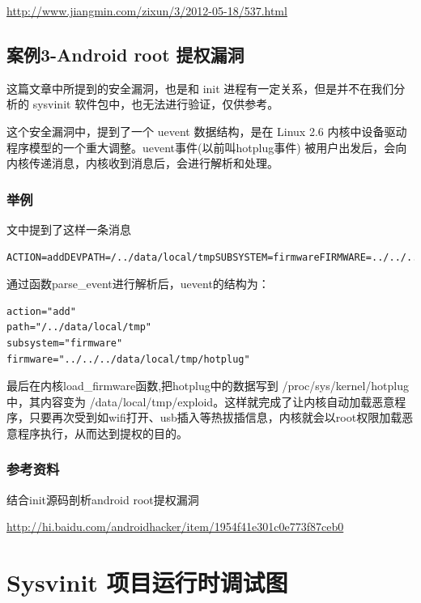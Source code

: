 \url{http://www.jiangmin.com/zixun/3/2012-05-18/537.html}

\section{案例3-Android root 提权漏洞}

这篇文章中所提到的安全漏洞，也是和 init
进程有一定关系，但是并不在我们分析的 sysvinit
软件包中，也无法进行验证，仅供参考。

这个安全漏洞中，提到了一个 uevent 数据结构，是在 Linux 2.6
内核中设备驱动程序模型的一个重大调整。uevent事件(以前叫hotplug事件)
被用户出发后，会向内核传递消息，内核收到消息后，会进行解析和处理。

\subsection{举例}

文中提到了这样一条消息

{\begin{shaded}\begin{verbatim}
ACTION=addDEVPATH=/../data/local/tmpSUBSYSTEM=firmwareFIRMWARE=../../../data/local/tmp/hotplug
\end{verbatim}\end{shaded}}
通过函数parse\_event进行解析后，uevent的结构为：

{\begin{shaded}\begin{verbatim}
action="add"
path="/../data/local/tmp"
subsystem="firmware"
firmware="../../../data/local/tmp/hotplug"
\end{verbatim}\end{shaded}}
最后在内核load\_firmware函数,把hotplug中的数据写到
/proc/sys/kernel/hotplug 中，其内容变为
/data/local/tmp/exploid。这样就完成了让内核自动加载恶意程序，只要再次受到如wifi打开、usb插入等热拔插信息，内核就会以root权限加载恶意程序执行，从而达到提权的目的。

\subsection{参考资料}

结合init源码剖析android root提权漏洞

\url{http://hi.baidu.com/androidhacker/item/1954f41e301c0e773f87ceb0}

\chapter{Sysvinit 项目运行时调试图}

